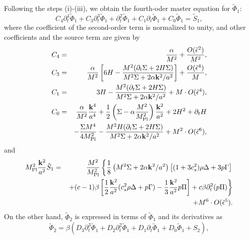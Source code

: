 Following the steps (i)-(iii), we obtain the fourth-oder master equation
for $\tilde{\Phi}_1$: 
%
\begin{equation}
 C_4\partial_t^4\tilde{\Phi}_1 + C_3\partial_t^3\tilde{\Phi}_1 + \partial_t^2\tilde{\Phi}_1 +
  C_1\partial_t\tilde{\Phi}_1 + C_0\tilde{\Phi}_1 = \tilde{S}_1,
\end{equation}
where the coefficient of the second-order term is normalized to unity,
and other coefficients and the source term are given by 
%
\begin{eqnarray}
 C_4 & = & \frac{\alpha}{M^2} + \frac{O(\tilde{\epsilon}^2)}{M^2},
  \nonumber\\
 C_3 & = & \frac{\alpha}{M^2}
  \left[ 6H-\frac{M^2(\partial_t\Sigma+2H\Sigma)}
   {M^2\Sigma+2\alpha{\bf k}^2/a^2}\right]
  + \frac{O(\tilde{\epsilon}^4)}{M},\nonumber\\
 C_1 & = & 3H - 
  \frac{M^2(\partial_t\Sigma+2H\Sigma)}{M^2\Sigma+2\alpha{\bf k}^2/a^2} +
  M\cdot O(\tilde{\epsilon}^4),\nonumber\\
 C_0 & = & \frac{\alpha}{M^2}\frac{{\bf k}^4}{a^4} +
  \frac{1}{2}\left(\Sigma-\alpha\frac{M^2}{M_{\rm Pl}^2}
  \right)\frac{{\bf k}^2}{a^2} + 2H^2+\partial_t H \nonumber\\
 & & -\frac{\Sigma M^4}{4M_{\rm Pl}^2}
  -\frac{M^2H(\partial_t\Sigma+2H\Sigma)}
  {M^2\Sigma+2\alpha{\bf k}^2/a^2}
  + M^2\cdot O(\tilde{\epsilon}^6),
  \label{eqn:C-def}
\end{eqnarray}
and
%
\begin{eqnarray}
 M_{\rm Pl}^2\frac{{\bf k}^2}{a^2}\tilde{S}_1 & = & \frac{M^2}{M_{\rm Pl}^2}
  \left\{\frac{1}{8}
   \left( M^2\Sigma+2\alpha{\bf k}^2/a^2\right)
   \left[(1+3c_s^2)\rho\Delta+3p\Gamma\right] 
   \right.\nonumber\\
 & & \left.
   + (c-1)\beta
   \left[
    \frac{1}{2}\frac{{\bf k}^2}{a^2}(c_s^2\rho\Delta+p\Gamma)
    -\frac{1}{3}\frac{{\bf k}^2}{a^2}p\Pi
   \right]
   + c\beta \partial_t^2(p\Pi) \right\}
 \nonumber\\
 & & + M^6\cdot O(\tilde{\epsilon}^5).
\end{eqnarray}
On the other hand, $\tilde{\Phi}_2$ is expressed in terms of $\tilde{\Phi}_1$ and its
derivatives as
%
\begin{equation}
 \tilde{\Phi}_2 = \beta\left(D_3\partial_t^3\tilde{\Phi}_1 
  + D_2\partial_t^2\tilde{\Phi}_1 + D_1\partial_t\tilde{\Phi}_1 +
  D_0\tilde{\Phi}_1 + S_2\right),
\end{equation}
